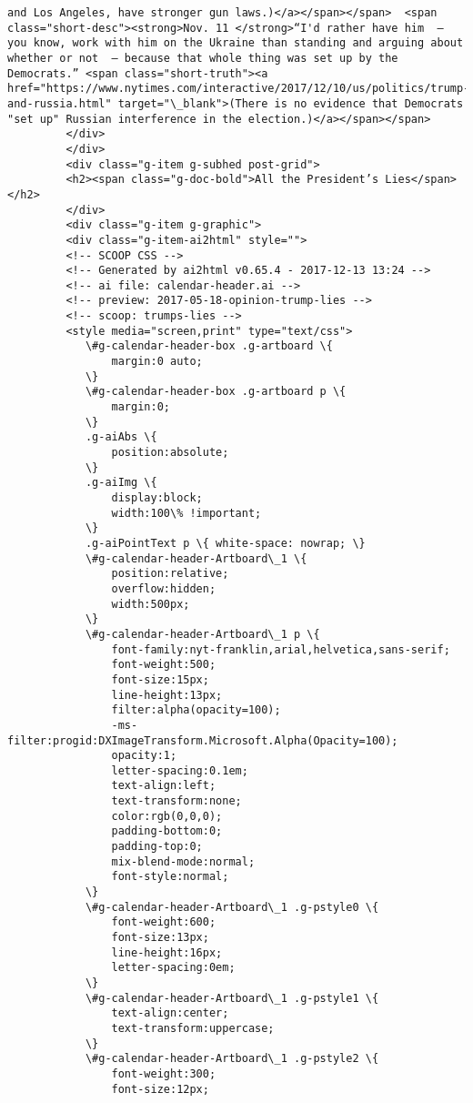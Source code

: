 \documentclass[11pt]{article}
\begin{document}
\begin{Verbatim}[commandchars=\\\{\}]
and Los Angeles, have stronger gun laws.)</a></span></span>  <span class="short-desc"><strong>Nov. 11 </strong>“I'd rather have him  – you know, work with him on the Ukraine than standing and arguing about whether or not  – because that whole thing was set up by the Democrats.” <span class="short-truth"><a href="https://www.nytimes.com/interactive/2017/12/10/us/politics/trump-and-russia.html" target="\_blank">(There is no evidence that Democrats "set up" Russian interference in the election.)</a></span></span>
         </div>
         </div>
         <div class="g-item g-subhed post-grid">
         <h2><span class="g-doc-bold">All the President’s Lies</span></h2>
         </div>
         <div class="g-item g-graphic">
         <div class="g-item-ai2html" style="">
         <!-- SCOOP CSS -->
         <!-- Generated by ai2html v0.65.4 - 2017-12-13 13:24 -->
         <!-- ai file: calendar-header.ai -->
         <!-- preview: 2017-05-18-opinion-trump-lies -->
         <!-- scoop: trumps-lies -->
         <style media="screen,print" type="text/css">
         	\#g-calendar-header-box .g-artboard \{
         		margin:0 auto;
         	\}
         	\#g-calendar-header-box .g-artboard p \{
         		margin:0;
         	\}
         	.g-aiAbs \{
         		position:absolute;
         	\}
         	.g-aiImg \{
         		display:block;
         		width:100\% !important;
         	\}
         	.g-aiPointText p \{ white-space: nowrap; \}
         	\#g-calendar-header-Artboard\_1 \{
         		position:relative;
         		overflow:hidden;
         		width:500px;
         	\}
         	\#g-calendar-header-Artboard\_1 p \{
         		font-family:nyt-franklin,arial,helvetica,sans-serif;
         		font-weight:500;
         		font-size:15px;
         		line-height:13px;
         		filter:alpha(opacity=100);
         		-ms-filter:progid:DXImageTransform.Microsoft.Alpha(Opacity=100);
         		opacity:1;
         		letter-spacing:0.1em;
         		text-align:left;
         		text-transform:none;
         		color:rgb(0,0,0);
         		padding-bottom:0;
         		padding-top:0;
         		mix-blend-mode:normal;
         		font-style:normal;
         	\}
         	\#g-calendar-header-Artboard\_1 .g-pstyle0 \{
         		font-weight:600;
         		font-size:13px;
         		line-height:16px;
         		letter-spacing:0em;
         	\}
         	\#g-calendar-header-Artboard\_1 .g-pstyle1 \{
         		text-align:center;
         		text-transform:uppercase;
         	\}
         	\#g-calendar-header-Artboard\_1 .g-pstyle2 \{
         		font-weight:300;
         		font-size:12px;

\end{Verbatim}
\end{document}
